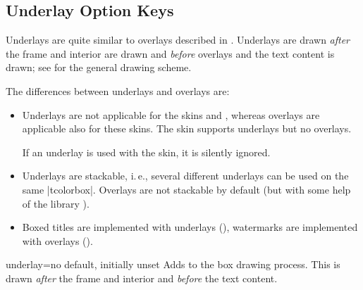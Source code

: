 \clearpage
\subsection{Underlay Option Keys}\label{subsec:skinunderlay}

Underlays are quite similar to overlays described in .
Underlays are drawn \emph{after} the frame and interior are
drawn and \emph{before} overlays and the text content is drawn; see
 for the general drawing scheme.

The differences between underlays and overlays are:
\begin{itemize}
\item Underlays are not applicable for the skins
   and
  ,
  whereas overlays are applicable also for these skins.
  The skin  supports underlays but no overlays.
  \begin{marker}
  If an underlay is used with the  skin, it is silently ignored.
  \end{marker}
\item Underlays are stackable, i.\,e., several different underlays can be
  used on the same |tcolorbox|. Overlays are not stackable by default (but with
  some help of the library ).
\item Boxed titles are implemented with underlays (),
  watermarks are implemented with overlays ().
\end{itemize}


\begin{docTcbKey}{underlay}{=}{no default, initially unset}
  Adds  to the box drawing process. This 
  is drawn \emph{after} the frame and interior and \emph{before} the text content.
\end{docTcbKey}


